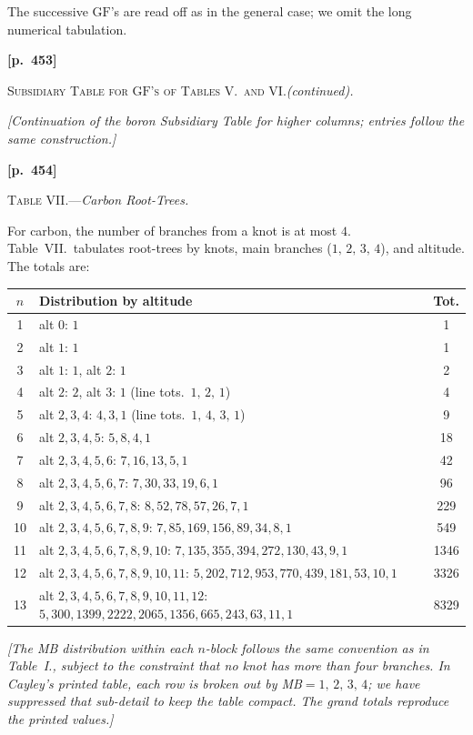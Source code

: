 \documentclass[11pt,a4paper]{article}
\providecommand{\GF}{\mathrm{GF}}
\begin{document}
The successive $\GF$'s are read off as in the general case; we omit the long numerical tabulation.

\bigskip
\noindent\textbf{[p.~453]}\quad
\begin{center}
\textsc{Subsidiary Table for $\GF$'s of Tables V.\ and VI.}\quad\textit{(continued).}
\end{center}

\noindent\textit{[Continuation of the boron Subsidiary Table for higher columns; entries follow the same construction.]}

\newpage
\noindent\textbf{[p.~454]}\quad
\begin{center}
\textsc{Table VII.}\quad---\quad\textit{Carbon Root-Trees.}
\end{center}

\noindent For carbon, the number of branches from a knot is at most $4$. Table~VII.\ tabulates root-trees by knots, main branches ($1,\,2,\,3,\,4$), and altitude. The totals are:
\begin{center}
\begin{tabular}{c|l|c}
$n$ & Distribution by altitude & Tot.\\\hline
1 & alt $0$: $1$ & 1\\
2 & alt $1$: $1$ & 1\\
3 & alt $1$: $1$, alt $2$: $1$ & 2\\
4 & alt $2$: $2$, alt $3$: $1$ \quad (line tots.\ $1,\,2,\,1$) & 4\\
5 & alt $2,3,4$: $4,3,1$ \quad (line tots.\ $1,\,4,\,3,\,1$) & 9\\
6 & alt $2,3,4,5$: $5,8,4,1$ & 18\\
7 & alt $2,3,4,5,6$: $7,16,13,5,1$ & 42\\
8 & alt $2,3,4,5,6,7$: $7,30,33,19,6,1$ & 96\\
9 & alt $2,3,4,5,6,7,8$: $8,52,78,57,26,7,1$ & 229\\
10 & alt $2,3,4,5,6,7,8,9$: $7,85,169,156,89,34,8,1$ & 549\\
11 & alt $2,3,4,5,6,7,8,9,10$: $7,135,355,394,272,130,43,9,1$ & 1346\\
12 & alt $2,3,4,5,6,7,8,9,10,11$: $5,202,712,953,770,439,181,53,10,1$ & 3326\\
13 & alt $2,3,4,5,6,7,8,9,10,11,12$: $5,300,1399,2222,2065,1356,665,243,63,11,1$ & 8329
\end{tabular}
\end{center}

\noindent\textit{[The MB distribution within each $n$-block follows the same convention as in Table~I., subject to the constraint that no knot has more than four branches.  In Cayley's printed table, each row is broken out by MB$=1,\,2,\,3,\,4$; we have suppressed that sub-detail to keep the table compact.  The grand totals reproduce the printed values.]}
\end{document}
